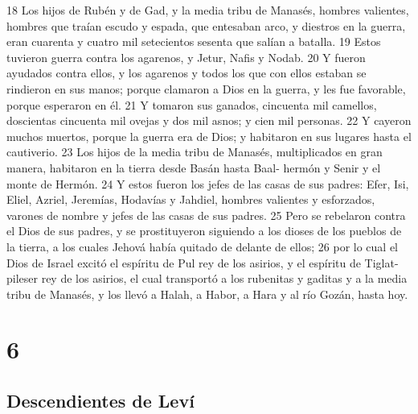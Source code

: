 18 Los hijos de Rubén y de Gad, y la media tribu de Manasés, hombres valientes, hombres que traían escudo y espada, que entesaban arco, y diestros en la guerra, eran cuarenta y cuatro mil setecientos sesenta que salían a batalla.
19 Estos tuvieron guerra contra los agarenos, y Jetur, Nafis y Nodab.
20 Y fueron ayudados contra ellos, y los agarenos y todos los que con ellos estaban se rindieron en sus manos; porque clamaron a Dios en la guerra, y les fue favorable, porque esperaron en él.
21 Y tomaron sus ganados, cincuenta mil camellos, doscientas cincuenta mil ovejas y dos mil asnos; y cien mil personas.
22 Y cayeron muchos muertos, porque la guerra era de Dios; y habitaron en sus lugares hasta el cautiverio.
23 Los hijos de la media tribu de Manasés, multiplicados en gran manera, habitaron en la tierra desde Basán hasta Baal- hermón y Senir y el monte de Hermón.
24 Y estos fueron los jefes de las casas de sus padres: Efer, Isi, Eliel, Azriel, Jeremías, Hodavías y Jahdiel, hombres valientes y esforzados, varones de nombre y jefes de las casas de sus padres.
25 Pero se rebelaron contra el Dios de sus padres, y se prostituyeron siguiendo a los dioses de los pueblos de la tierra, a los cuales Jehová había quitado de delante de ellos;
26 por lo cual el Dios de Israel excitó el espíritu de Pul rey de los asirios, y el espíritu de Tiglat-pileser rey de los asirios, el cual transportó a los rubenitas y gaditas y a la media tribu de Manasés, y los llevó a Halah, a Habor, a Hara y al río Gozán, hasta hoy. 

\chapter{6}

\section*{Descendientes de Leví}

